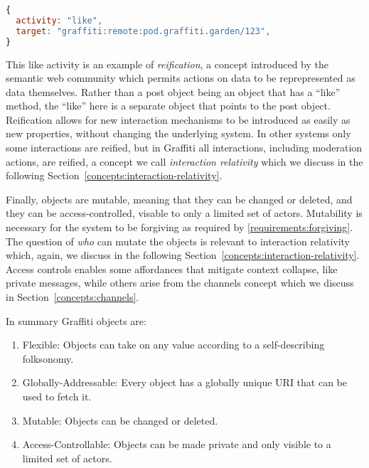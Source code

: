 \begin{lstlisting}[language=javascript]
{
  activity: "like",
  target: "graffiti:remote:pod.graffiti.garden/123",
}
\end{lstlisting}

This like activity is an example of \emph{reification},
a concept introduced by the semantic web community
which permits actions on data to be reprepresented as data themselves.
Rather than a post object being an object that has a ``like'' method,
the ``like'' here is a separate object that points to the post object.
Reification allows for new interaction mechanisms to be introduced as easily as new properties,
without changing the underlying system. In other systems only some interactions are reified,
but in Graffiti all interactions, including moderation actions, are reified,
a concept we call \emph{interaction relativity} which we discuss in the following
Section~\ref{concepts:interaction-relativity}.


Finally, objects are mutable, meaning that they can be changed or deleted,
and they can be access-controlled, visable to only a limited set of actors.
Mutability is necessary for the system to be forgiving as required by \ref{requirements:forgiving}.
The question of \emph{who} can mutate the objects is relevant to
interaction relativity which, again, we discuss in the following
Section~\ref{concepts:interaction-relativity}.
Access controls enables some affordances that mitigate context collapse,
like private messages, while others arise from the channels concept
which we discuss in Section~\ref{concepts:channels}.

In summary Graffiti objects are:

\begin{enumerate}
\item
Flexible: Objects can take on any value according to a self-describing folksonomy.
\item
Globally-Addressable: Every object has a globally unique URI that can be used to fetch it.
\item
Mutable: Objects can be changed or deleted.
\item
Access-Controllable: Objects can be made private and only visible to a limited set of actors.
\end{enumerate}

